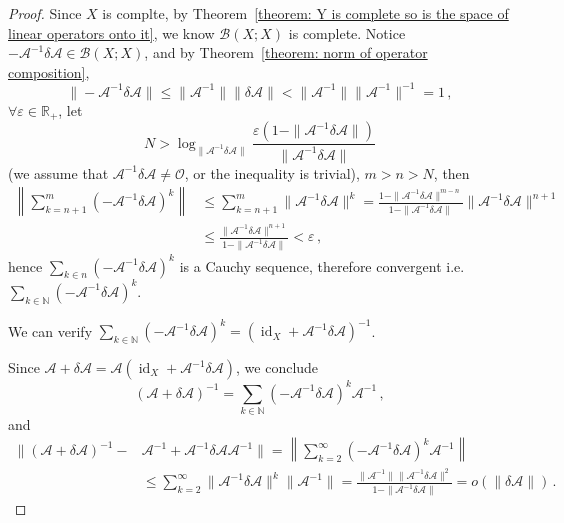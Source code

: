 \documentclass[openany]{book}
\theoremstyle{plain}
\theoremstyle{definition}
\DeclareMathOperator{\id}{id}
\begin{document}
\begin{proof}
	Since $X$ is complte, by Theorem~\ref{theorem: Y is complete so is the space of linear operators onto it}, we know $\mathcal B(X; X)$ is complete.
	Notice $ - \mathscr A^{-1} \delta \mathscr A \in \mathcal B(X; X)$, and by Theorem~\ref{theorem: norm of operator composition},
	\begin{equation*}
		\| -\mathscr A^{-1} \delta \mathscr A\| 
		\leq \|\mathscr A^{-1}\| \|\delta \mathscr A\| 
		< \|\mathscr A^{-1}\| \|\mathscr A^{-1}\|^{-1} = 1\,,
	\end{equation*} 
	$\forall \varepsilon \in \mathbb R_+$, let
	\begin{equation*}
		N > \log_{\|\mathscr A^{-1} \delta \mathscr A\|} 
		\frac{\varepsilon (1 - \|\mathscr A^{-1} \delta \mathscr A\|)}{\|\mathscr A^{-1} \delta \mathscr A\|}
	\end{equation*}
	(we assume that $\mathscr A^{-1} \delta \mathscr A \neq \mathscr O$, or the inequality is trivial), $m > n > N$, then
	\begin{align*}
		\left\|
			\sum_{k = n + 1}^{m}(-\mathscr A^{-1} \delta \mathscr A )^k
		\right\| 
			&\leq \sum_{k = n + 1}^{m} \|\mathscr A^{-1} \delta \mathscr A \|^k
			= \frac{1 - \|\mathscr A^{-1} \delta \mathscr A\|^{m - n}}{1 - \|\mathscr A^{-1} \delta \mathscr A\|} \|\mathscr A^{-1} \delta \mathscr A\|^{n + 1}
			\\
			&\leq \frac{\|\mathscr A^{-1} \delta \mathscr A\|^{n + 1}}{1 - \|\mathscr A^{-1} \delta \mathscr A\|} < \varepsilon\,,
	\end{align*}
	hence $\sum_{k \in n} (- \mathscr A^{-1} \delta \mathscr A)^k$ is a Cauchy sequence, therefore convergent i.e. $\sum_{k \in \mathbb N} (- \mathscr A^{-1} \delta \mathscr A)^k$.

	We can verify $\sum_{k \in \mathbb N} (- \mathscr A^{-1} \delta \mathscr A)^k = (\id_X + \mathscr A^{-1} \delta \mathscr A)^{-1}$.

	Since $\mathscr A + \delta \mathscr A = \mathscr A (\id_X + \mathscr A^{-1} \delta \mathscr A)$, we conclude
	\begin{equation*}
		(\mathscr A + \delta \mathscr A)^{-1} 
		= \sum_{k \in \mathbb N} (- \mathscr A^{-1} \delta \mathscr A)^k \mathscr A^{-1}\,,
	\end{equation*}
	and
	\begin{align*}
		\|(\mathscr A + \delta \mathscr A)^{-1} -& \mathscr A^{-1} + \mathscr A^{-1} \delta \mathscr A \mathscr A^{-1}\| 
		= \left\|
			\sum_{k = 2}^{\infty} (- \mathscr A^{-1} \delta \mathscr A)^k \mathscr A^{-1}
		\right\| 
		\\
		&\leq
		\sum_{k = 2}^{\infty} \|\mathscr A^{-1} \delta \mathscr A\|^k \|\mathscr A^{-1}\| 
		= \frac{\|\mathscr A^{-1}\| \|\mathscr A^{-1} \delta \mathscr A\|^2}{1 - \|\mathscr A^{-1} \delta \mathscr A\|}
		= o(\|\delta \mathscr A\|)\,.
	\end{align*}
\end{proof}
\end{document}
